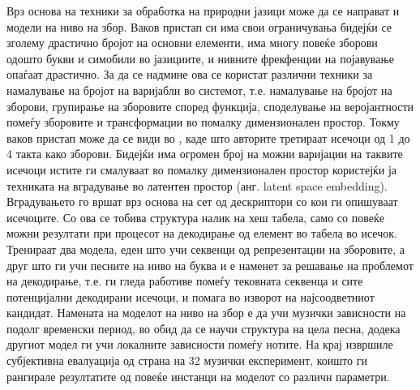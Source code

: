 Врз основа на техники за обработка на природни јазици може да се направат и модели на ниво на збор. Ваков пристап си има свои ограничувања бидејќи се зголему драстично бројот на основни елементи, има многу повеќе зборови одошто букви и симобили во јазициите, и нивните фрекфенции на појавување опаѓаат драстично. За да се надмине ова се користат различни техники за намалување на бројот на варијабли во системот, т.е. намалување на бројот на зборови, групирање на зборовите според функција, споделување на веројантности помеѓу зборовите и трансформации во помалку димензионален простор. Токму ваков пристап може да се види во \cite{Bretan2016}, каде што авторите третираат исечоци од 1 до 4 такта како зборови. Бидејќи има огромен број на можни варијации на таквите исечоци истите ги смалуваат во помалку димензионален простор користејќи ја техниката на вградување во латентен простор (анг. latent space embedding). Вградувањето го вршат врз основа на сет од дескриптори со кои ги опишуваат исечоците. Со ова се тобива структура налик на хеш табела, само со повеќе можни резултати при процесот на декодирање од елемент во табела во исечок. Тренираат два модела, еден што учи секвенци од репрезентации на зборовите, а друг што ги учи песните на ниво на буква и е наменет за решавање на проблемот на декодирање, т.е. ги гледа работиве помеѓу тековната секвенца и сите потенцијални декодирани исечоци, и помага во изворот на најсоодветниот кандидат. Намената на моделот на ниво на збор е да учи музички зависности на подолг временски период, во обид да се научи структура на цела песна, додека другиот модел ги учи локалните зависности помеѓу нотите. На крај извршиле субјективна евалуација од страна на 32 музички експеримент, коишто ги рангирале резултатите од повеќе инстанци на моделот со различн параметри.


